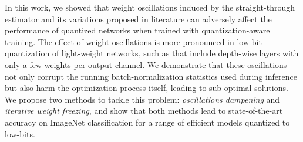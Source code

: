 In this work, we showed that weight oscillations induced by the straight-through estimator and its variations proposed in literature can adversely affect the performance of quantized networks when trained with quantization-aware training. The effect of weight oscillations is more pronounced in low-bit quantization of light-weight networks, such as  that include depth-wise layers with only a few weights per output channel. 
We demonstrate that these oscillations not only corrupt the running batch-normalization  statistics used during inference but also harm the optimization process itself, leading to sub-optimal solutions. We propose two methods to tackle this problem: \textit{oscillations dampening} and \textit{iterative weight freezing}, and  show that both methods lead to state-of-the-art accuracy on ImageNet classification for a range of efficient models quantized to low-bits. 